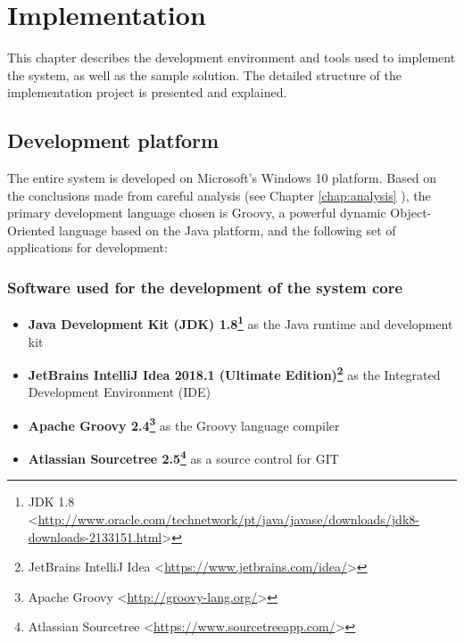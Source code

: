 \chapter{Implementation}

This chapter describes the development environment and tools used to implement the system, as well as the sample solution. The detailed structure of the implementation project is presented and explained.

\section{Development platform}

The entire system is developed on Microsoft's Windows 10 platform. Based on the conclusions made from careful analysis (see Chapter \ref{chap:analysis} ), the primary development language chosen is Groovy, a powerful dynamic Object-Oriented language based on the Java platform, and the following set of applications for development:

\subsection*{Software used for the development of the system core}
\begin{itemize}
    \item \textbf{Java Development Kit (JDK) 1.8\footnote{JDK 1.8 <\url{http://www.oracle.com/technetwork/pt/java/javase/downloads/jdk8-downloads-2133151.html}>}} as the Java runtime and development kit
    \item \textbf{JetBrains IntelliJ Idea 2018.1 (Ultimate Edition)\footnote{JetBrains IntelliJ Idea <\url{https://www.jetbrains.com/idea/}>}} as the Integrated Development Environment (IDE)
    \item \textbf{Apache Groovy 2.4\footnote{Apache Groovy <\url{http://groovy-lang.org/}>}} as the Groovy language compiler
    \item \textbf{Atlassian Sourcetree 2.5\footnote{Atlassian Sourcetree <\url{https://www.sourcetreeapp.com/}>}} as a source control for GIT
\end{itemize}


